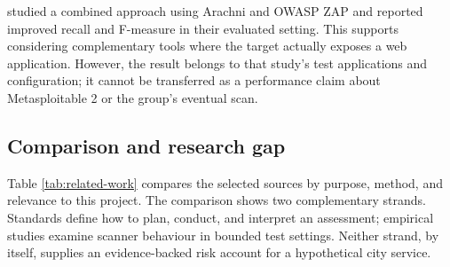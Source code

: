 \documentclass[11pt,a4paper]{article}
\begin{document}
\citet{abdulghaffar2023} studied a combined approach using Arachni and OWASP ZAP and reported improved recall and F-measure in their evaluated setting. This supports considering complementary tools where the target actually exposes a web application. However, the result belongs to that study's test applications and configuration; it cannot be transferred as a performance claim about Metasploitable 2 or the group's eventual scan.

\subsection{Comparison and research gap}
Table \ref{tab:related-work} compares the selected sources by purpose, method, and relevance to this project. The comparison shows two complementary strands. Standards define how to plan, conduct, and interpret an assessment; empirical studies examine scanner behaviour in bounded test settings. Neither strand, by itself, supplies an evidence-backed risk account for a hypothetical city service.
\end{document}
